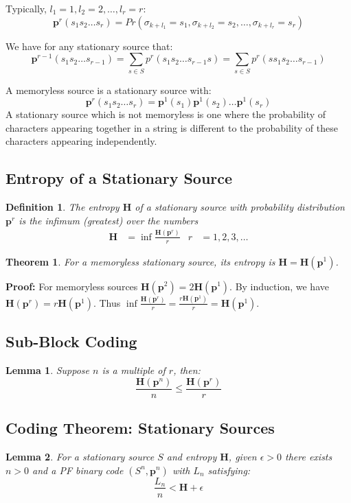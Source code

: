 \documentclass[11pt]{article}
\newtheorem{defn}{Definition}
\newtheorem{theo}{Theorem}
\newtheorem{lem}{Lemma}
\begin{document}
Typically, $l_1 = 1, l_2 = 2, \ldots, l_r = r$:
\[
  \textbf{p}^r(s_1 s_2 \ldots s_r) = Pr(\sigma_{k + l_1} = s_1, \sigma_{k + l_2} = s_2, \ldots, \sigma_{k + l_r} = s_r)
\]

We have for any stationary source that:
\[
  \textbf{p}^{r - 1}(s_1 s_2 \ldots s_{r - 1}) = \sum_{s \in S} p^r(s_1 s_2 \ldots s_{r - 1}s) = \sum_{s \in S} p^r(s s_1 s_2 \ldots s_{r - 1})
\]

A memoryless source is a stationary source with:
\[
  \textbf{p}^r(s_1 s_2 \ldots s_r) = \textbf{p}^1 (s_1) \textbf{p}^1 (s_2) \ldots \textbf{p}^1 (s_r)
\]
A stationary source which is not memoryless is one where the probability of characters appearing together in a string is different to the probability of these characters appearing independently.

\subsection{Entropy of a Stationary Source}
\begin{defn}
  The entropy $\textbf{H}$ of a stationary source with probability distribution $\textbf{p}^r$ is the infimum (greatest) over the numbers
  \begin{align*}
    \textbf{H} &= \inf \frac{\textbf{H}(\textbf{p}^r)}{r} & r &= 1, 2, 3, \ldots
  \end{align*}
\end{defn}

\begin{theo}
  For a memoryless stationary source, its entropy is $\textbf{H} = \textbf{H}(\textbf{p}^1)$.
\end{theo}

\textbf{Proof:}
For memoryless sources $\textbf{H}(\textbf{p}^2) = 2 \textbf{H}(\textbf{p}^1)$.
By induction, we have $\textbf{H}(\textbf{p}^r) = r \textbf{H}(\textbf{p}^1)$. 
Thus $\inf \frac{\textbf{H}(\textbf{p}^r)}{r} = \frac{r \textbf{H}(\textbf{p}^1)}{r} = \textbf{H}(\textbf{p}^1)$.

\subsection{Sub-Block Coding}
\begin{lem}
  Suppose $n$ is a multiple of $r$, then:
  \[
     \frac{\textbf{H}(\textbf{p}^n)}{n} \leq \frac{\textbf{H}(\textbf{p}^r)}{r}
  \]
\end{lem}

\subsection{Coding Theorem: Stationary Sources}
\begin{lem}
  For a stationary source $S$ and entropy $\textbf{H}$, given $\epsilon > 0$ there exists $n > 0$ and a PF binary code $(S^n, \textbf{p}^n)$ with $L_n$ satisfying:
  \[
    \frac{L_n}{n} < \textbf{H} + \epsilon
  \]
\end{lem}
\end{document}
